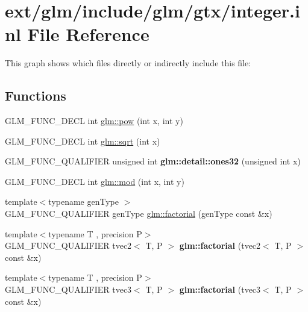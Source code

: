 \hypertarget{gtx_2integer_8inl}{\section{ext/glm/include/glm/gtx/integer.inl File Reference}
\label{gtx_2integer_8inl}
}
This graph shows which files directly or indirectly include this file\-:
\subsection*{Functions}
\begin{DoxyCompactItemize}
\item 
G\-L\-M\-\_\-\-F\-U\-N\-C\-\_\-\-D\-E\-C\-L int \hyperlink{group__gtx__integer_ga9642514a44a67afa70966d756f040ca9}{glm\-::pow} (int x, int y)
\item 
G\-L\-M\-\_\-\-F\-U\-N\-C\-\_\-\-D\-E\-C\-L int \hyperlink{group__gtx__integer_ga78e2e68330e91d350fcfc2f4831cad12}{glm\-::sqrt} (int x)
\item 
\hypertarget{namespaceglm_1_1detail_a2699e3b3ea6ad8d4bb99aed56761582c}{G\-L\-M\-\_\-\-F\-U\-N\-C\-\_\-\-Q\-U\-A\-L\-I\-F\-I\-E\-R unsigned int {\bfseries glm\-::detail\-::ones32} (unsigned int x)}\label{namespaceglm_1_1detail_a2699e3b3ea6ad8d4bb99aed56761582c}

\item 
G\-L\-M\-\_\-\-F\-U\-N\-C\-\_\-\-D\-E\-C\-L int \hyperlink{group__gtx__integer_gab9d22df91aac4d9eb925a4910f556f1b}{glm\-::mod} (int x, int y)
\item 
{\footnotesize template$<$typename gen\-Type $>$ }\\G\-L\-M\-\_\-\-F\-U\-N\-C\-\_\-\-Q\-U\-A\-L\-I\-F\-I\-E\-R gen\-Type \hyperlink{group__gtx__integer_ga8cbd3120905f398ec321b5d1836e08fb}{glm\-::factorial} (gen\-Type const \&x)
\item 
\hypertarget{namespaceglm_a2413666012b76baf1d3f0c44002f1154}{{\footnotesize template$<$typename T , precision P$>$ }\\G\-L\-M\-\_\-\-F\-U\-N\-C\-\_\-\-Q\-U\-A\-L\-I\-F\-I\-E\-R tvec2$<$ T, P $>$ {\bfseries glm\-::factorial} (tvec2$<$ T, P $>$ const \&x)}\label{namespaceglm_a2413666012b76baf1d3f0c44002f1154}

\item 
\hypertarget{namespaceglm_ab41ee15497a5efb175292e635daa4918}{{\footnotesize template$<$typename T , precision P$>$ }\\G\-L\-M\-\_\-\-F\-U\-N\-C\-\_\-\-Q\-U\-A\-L\-I\-F\-I\-E\-R tvec3$<$ T, P $>$ {\bfseries glm\-::factorial} (tvec3$<$ T, P $>$ const \&x)}\label{namespaceglm_ab41ee15497a5efb175292e635daa4918}


\end{DoxyCompactItemize}
